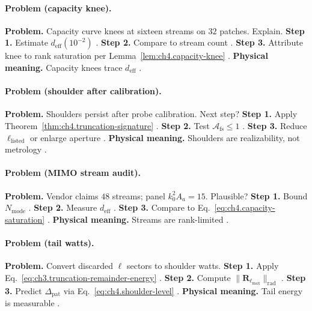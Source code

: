 \paragraph{Problem (capacity knee).}
\textbf{Problem.} Capacity curve knees at sixteen streams on \(32\) patches. Explain.
\textbf{Step 1.} Estimate \(d_{\mathrm{eff}}(10^{-2})\) \cite{hansen1988,harrington2001}.
\textbf{Step 2.} Compare to stream count \cite{devaney2004,collin2001}.
\textbf{Step 3.} Attribute knee to rank saturation per Lemma~\ref{lem:ch4.capacity-knee} \cite{stratton1941}.
\textbf{Physical meaning.} Capacity knees trace \(d_{\mathrm{eff}}\) \cite{harrington2001,jackson1999}.

\paragraph{Problem (shoulder after calibration).}
\textbf{Problem.} Shoulders persist after probe calibration. Next step?
\textbf{Step 1.} Apply Theorem~\ref{thm:ch4.truncation-signature} \cite{hansen1988,stratton1941}.
\textbf{Step 2.} Test \(\mathcal{A}_{\mathrm{fs}}\le1\) \cite{harrington2001,devaney2004}.
\textbf{Step 3.} Reduce \(\ell_{\mathrm{listed}}\) or enlarge aperture \cite{jackson1999,collin2001}.
\textbf{Physical meaning.} Shoulders are realizability, not metrology \cite{stratton1941}.

\paragraph{Problem (MIMO stream audit).}
\textbf{Problem.} Vendor claims \(48\) streams; panel \(k_{0}^{2}A_{a}=15\). Plausible?
\textbf{Step 1.} Bound \(N_{\mathrm{mode}}\) \cite{jackson1999,hansen1988}.
\textbf{Step 2.} Measure \(d_{\mathrm{eff}}\) \cite{harrington2001,devaney2004}.
\textbf{Step 3.} Compare to Eq.~\eqref{eq:ch4.capacity-saturation} \cite{collin2001,stratton1941}.
\textbf{Physical meaning.} Streams are rank-limited \cite{harrington2001}.

\paragraph{Problem (tail watts).}
\textbf{Problem.} Convert discarded \(\ell\) sectors to shoulder watts.
\textbf{Step 1.} Apply Eq.~\eqref{eq:ch3.truncation-remainder-energy} \cite{hansen1988,stratton1941}.
\textbf{Step 2.} Compute \(\|\mathbf{R}_{\ell_{\max}}\|_{\mathrm{rad}}\) \cite{harrington2001,devaney2004}.
\textbf{Step 3.} Predict \(\Delta_{\mathrm{pat}}\) via Eq.~\eqref{eq:ch4.shoulder-level} \cite{jackson1999}.
\textbf{Physical meaning.} Tail energy is measurable \cite{stratton1941,collin2001}.

